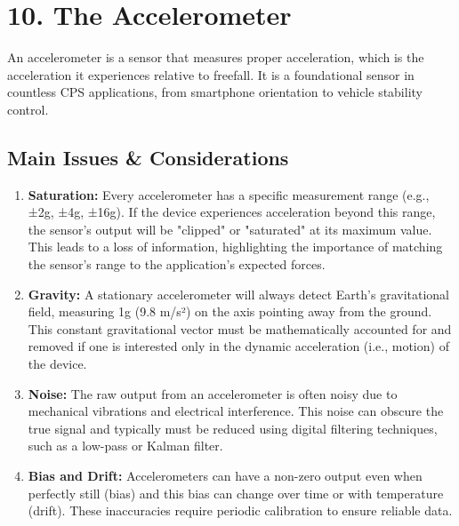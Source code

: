 \documentclass[a4paper,12pt]{article}
\begin{document}
\section*{10. The Accelerometer}

An accelerometer is a sensor that measures proper acceleration, which is the acceleration it experiences relative to freefall. It is a foundational sensor in countless CPS applications, from smartphone orientation to vehicle stability control.

\subsection*{Main Issues \& Considerations}
\begin{enumerate}
    \item \textbf{Saturation:} Every accelerometer has a specific measurement range (e.g., ±2g, ±4g, ±16g). If the device experiences acceleration beyond this range, the sensor's output will be "clipped" or "saturated" at its maximum value. This leads to a loss of information, highlighting the importance of matching the sensor's range to the application's expected forces. 
    \item \textbf{Gravity:} A stationary accelerometer will always detect Earth's gravitational field, measuring 1g (9.8 m/s²) on the axis pointing away from the ground. This constant gravitational vector must be mathematically accounted for and removed if one is interested only in the dynamic acceleration (i.e., motion) of the device.
    \item \textbf{Noise:} The raw output from an accelerometer is often noisy due to mechanical vibrations and electrical interference. This noise can obscure the true signal and typically must be reduced using digital filtering techniques, such as a low-pass or Kalman filter.
    \item \textbf{Bias and Drift:} Accelerometers can have a non-zero output even when perfectly still (bias) and this bias can change over time or with temperature (drift). These inaccuracies require periodic calibration to ensure reliable data.
\end{enumerate}
\end{document}
